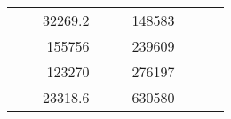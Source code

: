 \begin{table}[H]
\begin{tabular}{|ccrccrccc}
\multicolumn{1}{|c|}{\cellcolor[HTML]{FFFFC7}}                                & \multicolumn{1}{c|}{\cellcolor[HTML]{DDFDFF}}                      & \multicolumn{1}{r|}{\cellcolor[HTML]{DAE8FC}32269.2}   & \multicolumn{1}{c|}{\cellcolor[HTML]{FFFFC7}}                                & \multicolumn{1}{c|}{\cellcolor[HTML]{DDFDFF}}                       & \multicolumn{1}{r|}{\cellcolor[HTML]{DDFDFF}148583}    &                                                                              &                                                                    &                                                        \\ \cline{3-3} \cline{6-6}
\multicolumn{1}{|c|}{\cellcolor[HTML]{FFFFC7}}                                & \multicolumn{1}{c|}{\cellcolor[HTML]{DDFDFF}}                      & \multicolumn{1}{r|}{\cellcolor[HTML]{DDFDFF}155756}    & \multicolumn{1}{c|}{\cellcolor[HTML]{FFFFC7}}                                & \multicolumn{1}{c|}{\cellcolor[HTML]{DDFDFF}}                       & \multicolumn{1}{r|}{\cellcolor[HTML]{DAE8FC}239609}    &                                                                              &                                                                    &                                                        \\ \cline{3-3} \cline{6-6}
\multicolumn{1}{|c|}{\cellcolor[HTML]{FFFFC7}}                                & \multicolumn{1}{c|}{\cellcolor[HTML]{DDFDFF}}                      & \multicolumn{1}{r|}{\cellcolor[HTML]{DAE8FC}123270}    & \multicolumn{1}{c|}{\cellcolor[HTML]{FFFFC7}}                                & \multicolumn{1}{c|}{\cellcolor[HTML]{DDFDFF}}                       & \multicolumn{1}{r|}{\cellcolor[HTML]{DDFDFF}276197}    &                                                                              &                                                                    &                                                        \\ \cline{3-3} \cline{6-6}
\multicolumn{1}{|c|}{\cellcolor[HTML]{FFFFC7}}                                & \multicolumn{1}{c|}{\cellcolor[HTML]{DDFDFF}}                      & \multicolumn{1}{r|}{\cellcolor[HTML]{DDFDFF}23318.6}   & \multicolumn{1}{c|}{\cellcolor[HTML]{FFFFC7}}                                & \multicolumn{1}{c|}{\cellcolor[HTML]{DDFDFF}}                       & \multicolumn{1}{r|}{\cellcolor[HTML]{DAE8FC}630580}    &                                                                              &                                                                    &                                                        \\ \cline{3-3} \cline{6-6}

\end{tabular}
\end{table}
